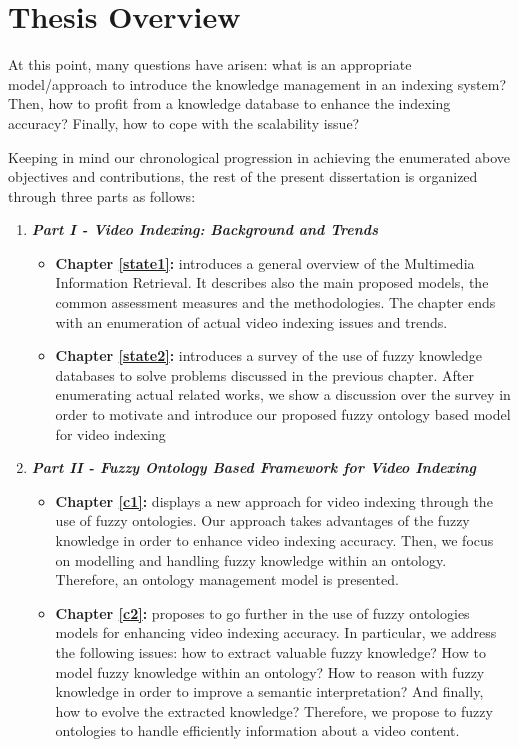 	\section{Thesis Overview}

	At this point, many questions have arisen: what is an appropriate model/approach to introduce the
	knowledge management in an indexing system? Then, how to profit from a knowledge database to enhance 
	the indexing accuracy? Finally, how to cope with the scalability issue? 

	Keeping in mind our chronological progression in achieving the enumerated above objectives and 
	contributions, the rest of the present dissertation is organized through three parts as follows:

	\begin{enumerate}
		\item \textit{\textbf{Part I - Video Indexing: Background and Trends}}
		\begin{itemize}
			\item \textbf{Chapter \ref{state1}:} introduces a general overview of the Multimedia Information Retrieval.
			It describes also the main proposed models, the common assessment measures and the methodologies.
			The chapter ends with an enumeration of actual video indexing issues and trends.
			
			\item \textbf{Chapter \ref{state2}:} introduces a survey of the use of fuzzy knowledge databases to solve problems 
			discussed in the previous chapter. After enumerating actual related works, we show a discussion 
			over the survey in order to motivate and introduce our proposed fuzzy ontology based model 
			for video indexing	
		\end{itemize}

		\item \textit{\textbf{Part II - Fuzzy Ontology Based Framework for Video Indexing}}
		\begin{itemize}
			\item \textbf{Chapter \ref{c1}:} displays a new approach for video indexing through the use of 
				fuzzy ontologies. Our approach takes advantages of the fuzzy knowledge in order 
				to enhance video indexing accuracy. Then, we focus on modelling and handling 
				fuzzy knowledge within an ontology. Therefore, an ontology management model is presented.

			\item \textbf{Chapter \ref{c2}:} proposes to go further in the use of fuzzy ontologies models for 
				enhancing video indexing accuracy. In particular, we address the following issues: 
				how to extract valuable fuzzy knowledge? How to model  fuzzy knowledge within
				an ontology? How to reason with  fuzzy knowledge in order to improve a semantic
				interpretation? And finally, how to evolve the extracted knowledge? Therefore, we propose 
				to  fuzzy ontologies to handle efficiently information about 
				a video content.


\end{itemize}
\end{enumerate}
